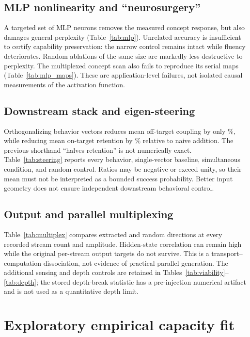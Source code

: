 \documentclass[11pt]{article}
\begin{document}
\subsection{MLP nonlinearity and ``neurosurgery''}
A targeted set of \neuronCount{} MLP neurons removes the measured concept response, but also damages general perplexity (Table~\ref{tab:mlp}). Unrelated accuracy is insufficient to certify capability preservation: the narrow control remains intact while fluency deteriorates. Random ablations of the same size are markedly less destructive to perplexity. The multiplexed concept scan also fails to reproduce its serial maps (Table~\ref{tab:mlp_maps}). These are application-level failures, not isolated causal measurements of the activation function.



\subsection{Downstream stack and eigen-steering}
Orthogonalizing behavior vectors reduces mean off-target coupling by only \crossReduction\%, while reducing mean on-target retention by \retentionLoss\% relative to naive addition. The previous shorthand ``halves retention'' is not numerically exact. Table~\ref{tab:steering} reports every behavior, single-vector baseline, simultaneous condition, and random control. Ratios may be negative or exceed unity, so their mean must not be interpreted as a bounded success probability. Better input geometry does not ensure independent downstream behavioral control.


\subsection{Output and parallel multiplexing}
Table~\ref{tab:multiplex} compares extracted and random directions at every recorded stream count and amplitude. Hidden-state correlation can remain high while the original per-stream output targets do not survive. This is a transport--computation dissociation, not evidence of practical parallel generation. The additional sensing and depth controls are retained in Tables~\ref{tab:viability}--\ref{tab:depth}; the stored depth-break statistic has a pre-injection numerical artifact and is not used as a quantitative depth limit.

\FloatBarrier

\section{Exploratory empirical capacity fit}
\end{document}

